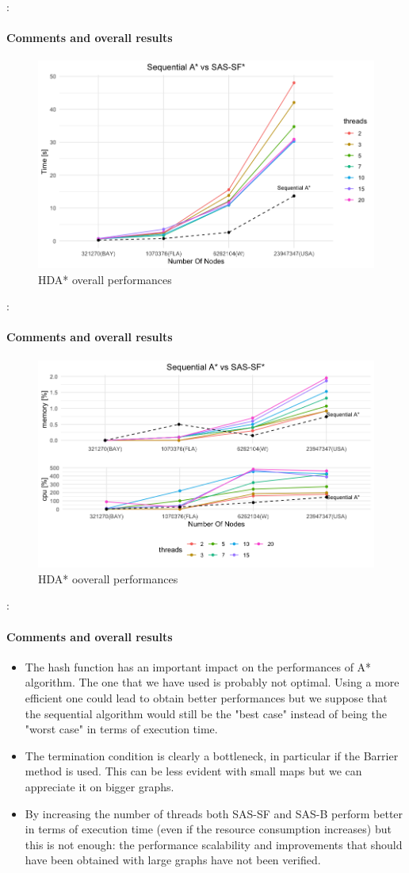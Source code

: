 \documentclass[12pt]{beamer}
\begin{document}
	\begin{frame}{\secname : \subsecname}
		\framesubtitle{Comments and overall results}
		\begin{figure}[ht!]
			\centering
			\includegraphics[width=0.8\linewidth]{hda/tottime.png}
			\caption{HDA* overall performances}
		\end{figure}
	\end{frame}
	\begin{frame}{\secname : \subsecname}
		\framesubtitle{Comments and overall results}
		\begin{figure}[ht!]
			\centering
			\includegraphics[width=0.8\linewidth]{hda/totcpumem.png}
			\caption{HDA* ooverall performances}
		\end{figure}
	\end{frame}
	\begin{frame}{\secname : \subsecname}
		\framesubtitle{Comments and overall results}
		\begin{itemize}
			\item The hash function has an important impact on the performances of A* algorithm. The one that
				  we have used is probably not optimal. Using a more efficient one could lead to obtain better performances but we
				  suppose that the sequential algorithm would still be the "best case" instead of being the "worst case"
				  in terms of execution time. 
			\item The termination condition is clearly a bottleneck, in particular if the Barrier method
				  is used. This can be less evident with small maps but we can appreciate it on bigger graphs.
			\item By increasing the number of threads both SAS-SF and SAS-B perform better in terms of execution time (even if
				  the resource consumption increases) but this is not enough: the performance scalability
				  and improvements that should have been obtained with large graphs have not been verified.
		  \end{itemize}
	\end{frame}
\end{document}
